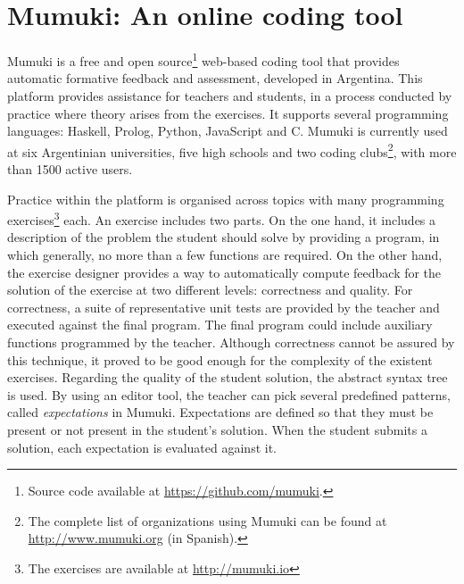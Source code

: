 \section{Mumuki: An online coding tool} \label{the-approach}



Mumuki is a free and open source\footnote{Source code available at \url{https://github.com/mumuki}.} web-based coding tool that provides automatic formative feedback and assessment, developed in Argentina. This platform provides assistance for teachers and students, in a process conducted by practice where theory arises from the exercises. It supports several programming languages: Haskell, Prolog, Python, JavaScript and C. Mumuki is currently used at six Argentinian universities, five high schools and two coding clubs\footnote{The complete list of organizations using Mumuki can be found at \url{http://www.mumuki.org} (in Spanish).}, with more than 1500 active users.

Practice within the platform is organised across topics with many programming exercises\footnote{The exercises are available at \url{http://mumuki.io}} each. An exercise includes two 
parts. On the one hand, it includes a description of the problem the student should solve by providing a program, in which generally, no more than a few functions are required. On the other hand, the exercise designer provides a way to automatically compute feedback for the solution of the exercise at two different levels: correctness and quality. For correctness, a suite of representative unit tests are provided by the teacher and executed against the final program. The final program could include auxiliary functions  programmed by the teacher. Although correctness cannot be assured by this technique, it proved to be good enough for the complexity  of the existent exercises. Regarding the quality of the student solution, the abstract syntax tree is used. By using an editor tool, the teacher can pick several predefined patterns, called \emph{expectations} in Mumuki. Expectations are defined so that
they must be present or not present in the student’s solution. When the student submits a solution, each expectation is evaluated against it.


